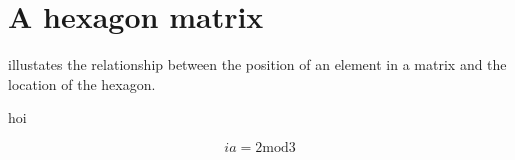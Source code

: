 \documentclass[onecolumn]{article}
\begin{document}
\section*{A hexagon matrix}
 illustates the relationship between the position of an element in a matrix and the location of the hexagon.




hoi

$$
ia = 2 \text{mod} 3
$$
\end{document}
